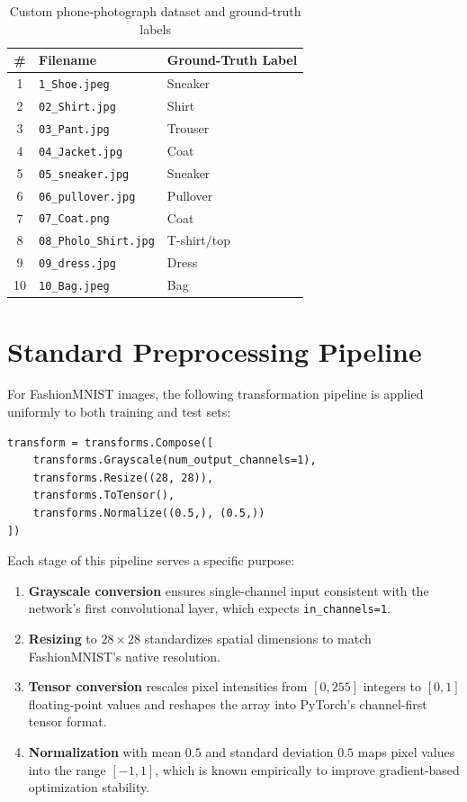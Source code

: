 \documentclass[12pt,a4paper]{report}
\begin{document}
\begin{table}[H]
\centering
\caption{Custom phone-photograph dataset and ground-truth labels}
\label{tab:customset}
\begin{tabular}{@{}cll@{}}
\toprule
\textbf{\#} & \textbf{Filename} & \textbf{Ground-Truth Label} \\
\midrule
1  & \texttt{1\_Shoe.jpeg}        & Sneaker \\
2  & \texttt{02\_Shirt.jpg}       & Shirt \\
3  & \texttt{03\_Pant.jpg}        & Trouser \\
4  & \texttt{04\_Jacket.jpg}      & Coat \\
5  & \texttt{05\_sneaker.jpg}     & Sneaker \\
6  & \texttt{06\_pullover.jpg}    & Pullover \\
7  & \texttt{07\_Coat.png}        & Coat \\
8  & \texttt{08\_Pholo\_Shirt.jpg}& T-shirt/top \\
9  & \texttt{09\_dress.jpg}       & Dress \\
10 & \texttt{10\_Bag.jpeg}        & Bag \\
\bottomrule
\end{tabular}
\end{table}

\section{Standard Preprocessing Pipeline}
For FashionMNIST images, the following transformation pipeline is applied uniformly to both training and test sets:

\begin{lstlisting}[caption={Standard preprocessing transform}, label={lst:transform}]
transform = transforms.Compose([
    transforms.Grayscale(num_output_channels=1),
    transforms.Resize((28, 28)),
    transforms.ToTensor(),
    transforms.Normalize((0.5,), (0.5,))
])
\end{lstlisting}

Each stage of this pipeline serves a specific purpose:

\begin{enumerate}
    \item \textbf{Grayscale conversion} ensures single-channel input consistent with the network's first convolutional layer, which expects \texttt{in\_channels=1}.
    \item \textbf{Resizing} to $28\times28$ standardizes spatial dimensions to match FashionMNIST's native resolution.
    \item \textbf{Tensor conversion} rescales pixel intensities from $[0,255]$ integers to $[0,1]$ floating-point values and reshapes the array into PyTorch's channel-first tensor format.
    \item \textbf{Normalization} with mean $0.5$ and standard deviation $0.5$ maps pixel values into the range $[-1, 1]$, which is known empirically to improve gradient-based optimization stability.
\end{enumerate}
\end{document}
